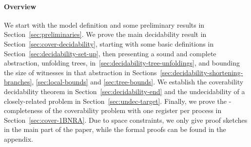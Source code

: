 \paragraph*{Overview}


We start with the model definition and some preliminary results in Section~\ref{sec:preliminaries}. We prove the main decidability result in Section~\ref{sec:cover-decidability}, starting with some basic definitions in Section~\ref{sec:decidability-set-up}, then presenting a sound and complete abstraction, unfolding trees, in~\ref{sec:decidability-tree-unfoldings}, and bounding the size of witnesses in that abstraction in Sections~\ref{sec:decidability-shortening-branches}, \ref{sec:local-bounds} and \ref{sec:tree-bounds}. We establish the coverability decidability theorem in Section~\ref{sec:decidability-end} and the undecidability of a closely-related problem in Section~\ref{sec:undec-target}. Finally, we prove the \NP-completeness of the coverability problem with one register per process in Section~\ref{sec:cover-1BNRA}.
Due to space constraints, we only give proof sketches in the main part of the paper, while the formal proofs can be found in the appendix.

%
%
%	
%
%
%
%	
%	
%	
%	
%	
%	
%	
%	
%	
%	
%	
%	
%	
%	
%	
%	
%	
%
	
